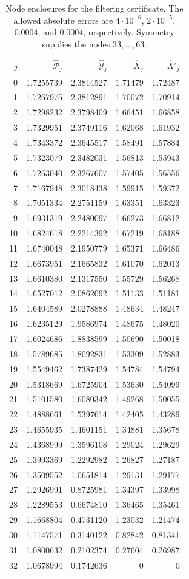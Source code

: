 \begin{table}[p]
\centering
\small
\begin{tabular}{r@{\qquad}rrrr}
\toprule
$j$ & $\widehat{\mathcal P}_j$ & $\widehat{\mathcal Y}_j$
& $\widehat X_j$ & $\widehat X'_j$\\
\midrule
0 &1.7255739&2.3814527&1.71479&1.72487\\
1 &1.7267975&2.3812891&1.70072&1.70914\\
2 &1.7298232&2.3798409&1.66451&1.66858\\
3 &1.7329951&2.3749116&1.62068&1.61932\\
4 &1.7343372&2.3645517&1.58491&1.57884\\
5 &1.7323079&2.3482031&1.56813&1.55943\\
6 &1.7263040&2.3267607&1.57405&1.56556\\
7 &1.7167948&2.3018438&1.59915&1.59372\\
8 &1.7051334&2.2751159&1.63351&1.63323\\
9 &1.6931319&2.2480097&1.66273&1.66812\\
10 &1.6824618&2.2214392&1.67219&1.68188\\
11 &1.6740048&2.1950779&1.65371&1.66486\\
12 &1.6673951&2.1665832&1.61070&1.62013\\
13 &1.6610380&2.1317550&1.55729&1.56268\\
14 &1.6527012&2.0862092&1.51133&1.51181\\
15 &1.6404589&2.0278888&1.48634&1.48247\\
16 &1.6235129&1.9586974&1.48675&1.48020\\
17 &1.6024686&1.8838599&1.50690&1.50018\\
18 &1.5789685&1.8092831&1.53309&1.52883\\
19 &1.5549462&1.7387429&1.54784&1.54794\\
20 &1.5318669&1.6725904&1.53630&1.54099\\
21 &1.5101580&1.6080342&1.49268&1.50055\\
22 &1.4888661&1.5397614&1.42405&1.43289\\
23 &1.4655935&1.4601151&1.34881&1.35678\\
24 &1.4368999&1.3596108&1.29024&1.29629\\
25 &1.3993369&1.2292982&1.26827&1.27187\\
26 &1.3509552&1.0651814&1.29131&1.29177\\
27 &1.2926991&0.8725981&1.34397&1.33998\\
28 &1.2289553&0.6674810&1.36465&1.35461\\
29 &1.1668804&0.4731120&1.23032&1.21474\\
30 &1.1147571&0.3140122&0.82842&0.81341\\
31 &1.0800632&0.2102374&0.27604&0.26987\\
32 &1.0678994&0.1742636&0&0\\
\bottomrule
\end{tabular}
\caption{Node enclosures for the filtering certificate.  The allowed
absolute errors are $4\cdot10^{-6}$, $2\cdot10^{-5}$, $0.0004$, and
$0.0004$, respectively.  Symmetry supplies the nodes $33,\ldots,63$.}
\label{tab:filter-certificate}
\end{table}

